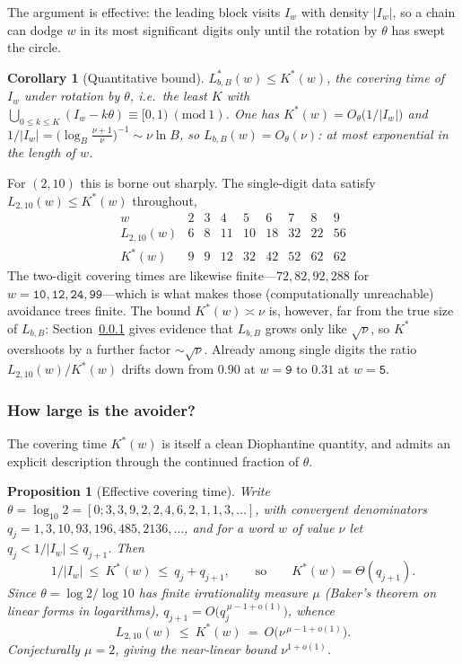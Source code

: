 \documentclass[a4paper]{article}
\theoremstyle{plain}
\newtheorem{proposition}{Proposition}[subsection]
\newtheorem{corollary}{Corollary}[subsection]
\theoremstyle{definition}
\theoremstyle{remark}
\newcommand{\Lbb}[1][b,B]{L_{#1}}
\begin{document}
The argument is effective: the leading block visits $I_w$ with density $|I_w|$, so a chain can dodge $w$ in its most significant digits only until the rotation by $\theta$ has swept the circle.

\begin{corollary}[Quantitative bound]\label{av:cor:quant}
$L^{*}_{b,B}(w)\le K^{*}(w)$, the covering time of $I_w$ under rotation by $\theta$, i.e.\ the least $K$ with $\bigcup_{0\le k\le K}(I_w-k\theta)\equiv[0,1)\ (\mathrm{mod}\ 1)$. One has $K^{*}(w)=O_\theta\!\bigl(1/|I_w|\bigr)$ and $1/|I_w|=\bigl(\log_B\tfrac{\nu+1}{\nu}\bigr)^{-1}\sim\nu\ln B$, so $\Lbb(w)=O_\theta(\nu)$: at most exponential in the length of $w$.
\end{corollary}

For $(2,10)$ this is borne out sharply. The single-digit data satisfy $L_{2,10}(w)\le K^{*}(w)$ throughout,
\[
\begin{array}{c|cccccccc}
w & 2&3&4&5&6&7&8&9\\\hline
L_{2,10}(w) & 6&8&11&10&18&32&22&56\\[1pt]
K^{*}(w) & 9&9&12&32&42&52&62&62
\end{array}
\]
The two-digit covering times are likewise finite---$72,82,92,288$ for $w=\texttt{10},\texttt{12},\texttt{24},\texttt{99}$---which is what makes those (computationally unreachable) avoidance trees finite. The bound $K^{*}(w)\asymp\nu$ is, however, far from the true size of $\Lbb$: Section~\ref{av:sec:bounds} gives evidence that $\Lbb$ grows only like $\sqrt\nu$, so $K^{*}$ overshoots by a further factor $\sim\sqrt\nu$. Already among single digits the ratio $L_{2,10}(w)/K^{*}(w)$ drifts down from $0.90$ at $w=\texttt{9}$ to $0.31$ at $w=\texttt{5}$.

\subsubsection{How large is the avoider?}\label{av:sec:bounds}

The covering time $K^{*}(w)$ is itself a clean Diophantine quantity, and admits an explicit description through the continued fraction of $\theta$.

\begin{proposition}[Effective covering time]\label{av:prop:cover}
Write $\theta=\log_{10}2=[0;3,3,9,2,2,4,6,2,1,1,3,\dots]$, with convergent denominators $q_j=1,3,10,93,196,485,2136,\dots$, and for a word $w$ of value $\nu$ let $q_j<1/|I_w|\le q_{j+1}$. Then
\[
1/|I_w|\ \le\ K^{*}(w)\ \le\ q_j+q_{j+1},\qquad\text{so}\qquad K^{*}(w)=\Theta(q_{j+1}).
\]
Since $\theta=\log2/\log10$ has \emph{finite} irrationality measure $\mu$ (Baker's theorem on linear forms in logarithms), $q_{j+1}=O\!\bigl(q_j^{\,\mu-1+o(1)}\bigr)$, whence
\[
\Lbb[2,10](w)\ \le\ K^{*}(w)\ =\ O\!\bigl(\nu^{\,\mu-1+o(1)}\bigr).
\]
Conjecturally $\mu=2$, giving the near-linear bound $\nu^{1+o(1)}$.
\end{proposition}
\end{document}
